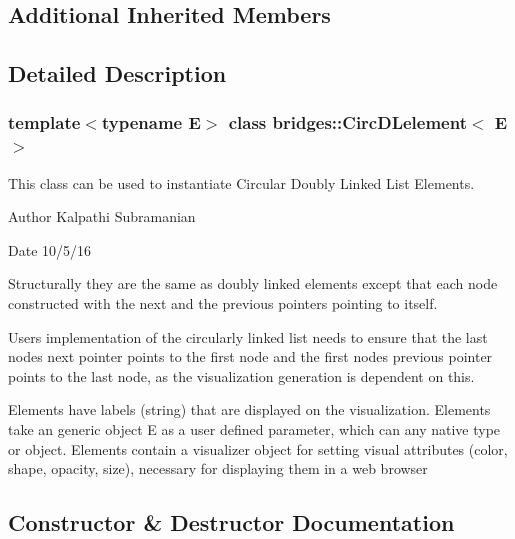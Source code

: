 \subsection*{Additional Inherited Members}


\subsection{Detailed Description}
\subsubsection*{template$<$typename E$>$\newline
class bridges\+::\+Circ\+D\+Lelement$<$ E $>$}

This class can be used to instantiate Circular Doubly Linked List Elements. 

\begin{DoxyAuthor}{Author}
Kalpathi Subramanian 
\end{DoxyAuthor}
\begin{DoxyDate}{Date}
10/5/16
\end{DoxyDate}
Structurally they are the same as doubly linked elements except that each node constructed with the next and the previous pointers pointing to itself.

User\textquotesingle{}s implementation of the circularly linked list needs to ensure that the last node\textquotesingle{}s next pointer points to the first node and the first node\textquotesingle{}s previous pointer points to the last node, as the visualization generation is dependent on this.

Elements have labels (string) that are displayed on the visualization. Elements take an generic object E as a user defined parameter, which can any native type or object. Elements contain a visualizer object for setting visual attributes (color, shape, opacity, size), necessary for displaying them in a web browser 

\subsection{Constructor \& Destructor Documentation}
\mbox{\label{classbridges_1_1_circ_d_lelement_a35279302f5fb5297eeb6efead475921e}} 
